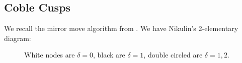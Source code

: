 \documentclass{amsart}
\begin{document}
\subsection{Coble Cusps}\label{coble-cusps}

\begin{remark}

We recall the mirror move algorithm from \cite{AE22nonsympinv}. We have Nikulin's 2-elementary diagram:

\begin{figure}[H]
\centering

\caption{White nodes are $\delta=0$, black are $\delta=1$, double circled are $\delta = 1,2$.}
\label{fig:nikulin_table}
\end{figure}

\end{remark}
\end{document}
